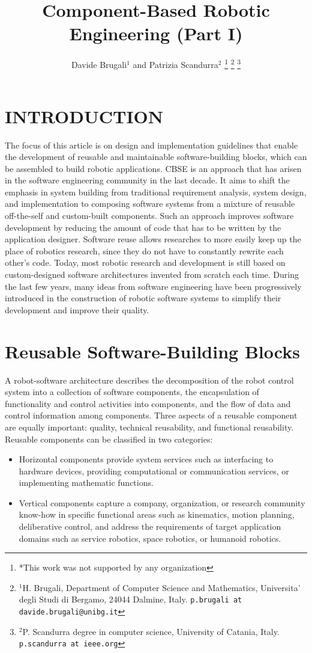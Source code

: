 \documentclass[letterpaper, 10 pt, conference]{ieeeconf}
\title{
\LARGE\bf
\textbf{Component-Based Robotic Engineering (Part I)}
}
\author{Davide Brugali$^{1}$ and Patrizia Scandurra$^{2}$
\thanks{*This work was not supported by any organization}
\thanks{$^{1}$H. Brugali, Department of Computer Science and Mathematics,
        Universita' degli Studi di Bergamo, 24044 Dalmine, Italy.
        {\tt\small p.brugali at davide.brugali@unibg.it}}
\thanks{$^{2}$P. Scandurra degree in computer science, University of Catania, Italy.
        {\tt\small p.scandurra at ieee.org}}
}
\begin{document}
\maketitle
\thispagestyle{empty}
\pagestyle{empty}

\section{INTRODUCTION}

The focus of this article is on design and implementation guidelines that enable the development of reusable and maintainable software-building blocks, which can be assembled to build robotic applications.
CBSE is an approach that has arisen in the software engineering community in the last decade. It aims to shift the emphasis in system building from traditional requirement analysis, system design, and implementation to composing software systems from a mixture of reusable off-the-self and custom-built components.
Such an approach improves software development by reducing the amount of code that has to be written by the application designer.
Software reuse allows researches to more easily keep up the place of robotics research, since they do not have to constantly rewrite each other's code.
Today, most robotic research and development is still based on custom-designed software architectures invented from scratch each time.
During the last few years, many ideas from software engineering have been progressively introduced in the construction of robotic software systems to simplify their development and improve their quality.

\section{Reusable Software-Building Blocks}
A robot-software architecture describes the decomposition of the robot control system into a collection of software components, the encapsulation of functionality and control activities into components, and the flow of data and control information among components.
Three aspects of a reusable component are equally important: quality, technical reusability, and functional reusability.
Reusable components can be classified in two categories: 
\begin{itemize}
\item Horizontal components provide system services such as interfacing to hardware devices, providing computational or communication services, or implementing mathematic functions.
\item Vertical components capture a company, organization, or research community know-how in specific functional areas such as kinematics, motion planning, deliberative control, and address the requirements of target application domains such as service robotics, space robotics, or humanoid robotics.
\end{itemize}
\end{document}
